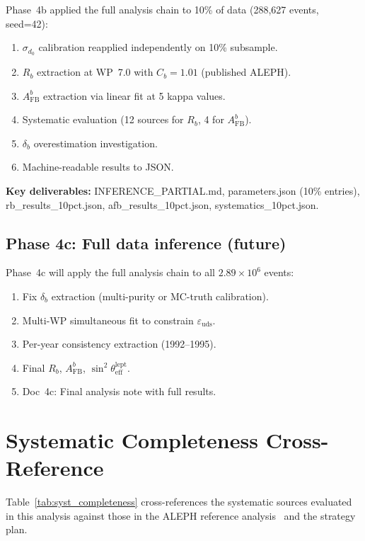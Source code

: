 \documentclass[11pt,a4paper]{article}
\begin{document}
Phase~4b applied the full analysis chain to 10\% of data (288,627 events, seed=42):
\begin{enumerate}
\item $\sigma_{d_0}$ calibration reapplied independently on 10\% subsample.
\item $R_b$ extraction at WP~7.0 with $C_b = 1.01$ (published ALEPH).
\item $A_\mathrm{FB}^b$ extraction via linear fit at 5 kappa values.
\item Systematic evaluation (12 sources for $R_b$, 4 for $A_\mathrm{FB}^b$).
\item $\delta_b$ overestimation investigation.
\item Machine-readable results to JSON.
\end{enumerate}

\textbf{Key deliverables:} INFERENCE\_PARTIAL.md, parameters.json (10\% entries),
rb\_results\_10pct.json, afb\_results\_10pct.json, systematics\_10pct.json.

\subsection{Phase 4c: Full data inference (future)}

Phase~4c will apply the full analysis chain to all $2.89 \times 10^6$ events:
\begin{enumerate}
\item Fix $\delta_b$ extraction (multi-purity or MC-truth calibration).
\item Multi-WP simultaneous fit to constrain $\varepsilon_\mathrm{uds}$.
\item Per-year consistency extraction (1992--1995).
\item Final $R_b$, $A_\mathrm{FB}^b$, $\sin^2\theta_\mathrm{eff}^\mathrm{lept}$.
\item Doc~4c: Final analysis note with full results.
\end{enumerate}

\section{Systematic Completeness Cross-Reference}
\label{app:syst_completeness}

Table~\ref{tab:syst_completeness} cross-references the systematic sources evaluated
in this analysis against those in the ALEPH reference analysis~\cite{ALEPH:Rb:1996}
and the strategy plan.
\end{document}
